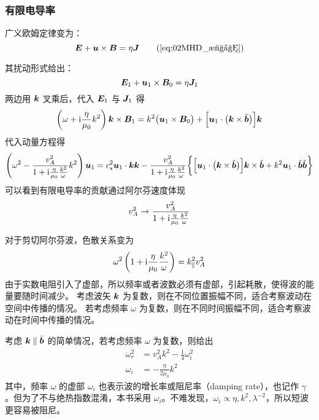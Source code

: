 \subsubsection{有限电导率}

广义欧姆定律变为：
\begin{equation}
\vector{E} + \vector{u} \times \vector{B} = \eta \vector{J} \tag{\ref{eq:02MHD_欧姆}}
\end{equation}

其扰动形式给出：
\begin{equation}
\bm{E}_1 + \bm{u}_1 \times \bm{B}_0 = \eta \bm{J}_1
\end{equation}
两边用 $\bm{k}$ 叉乘后，代入 $\bm{E}_1$ 与 $\bm{J}_1$ 得
\begin{equation}
\left( \omega + \mathrm{i} \frac{\eta}{\mu_0} k^2 \right) \bm{k} \times \bm{B}_1
= k^2 \big( \bm{u}_1 \times \bm{B}_0 \big) + \Big[ \bm{u}_1 \cdot \big(\bm{k} \times \hat{\bm{b}} \big) \Big] \bm{k}
\end{equation}
代入动量方程得
\begin{equation}
\left(\omega^2
    - \frac{v_A^2}{1 + \mathrm{i} \frac{\eta}{\mu_0}\frac{k^2}{\omega}} k^2
\right) \bm{u}_1
= c_s^2 \bm{u}_1 \cdot \bm{k} \bm{k}
- \frac{v_A^2}{1 + \mathrm{i} \frac{\eta}{\mu_0}\frac{k^2}{\omega}} \bigg\{
    \Big[ \bm{u}_1 \cdot \big(\bm{k} \times \hat{\bm{b}} \big) \Big] \bm{k} \times \hat{\bm{b}}
    + k^2 \bm{u}_1 \cdot \hat{\bm{b}} \hat{\bm{b}}
\bigg\}
\end{equation}
可以看到有限电导率的贡献通过阿尔芬速度体现
\begin{equation}
v_A^2 \rightarrow \frac{v_A^2}{1 + \mathrm{i} \frac{\eta}{\mu_0}\frac{k^2}{\omega}}
\end{equation}

对于剪切阿尔芬波，色散关系变为
\begin{equation}
\omega^2 \left(1 + \mathrm{i} \frac{\eta}{\mu_0}\frac{k^2}{\omega}\right) = k_\parallel^2 v_A^2
\end{equation}
由于实数电阻引入了虚部，所以频率或者波数必须有虚部，引起耗散，使得波的能量要随时间减少。
考虑波矢 $\bm{k}$ 为复数，则在不同位置振幅不同，适合考察波动在空间中传播的情况。
若考虑频率 $\omega$ 为复数，则在不同时间振幅不同，适合考察波动在时间中传播的情况。

考虑 $\bm{k} \parallel \hat{\bm{b}}$ 的简单情况，若考虑频率 $\omega$ 为复数，则给出
\begin{subequations}\begin{align}
\omega_r^2 &= v_A^2 k^2 - \frac{1}{4} \omega_i^2 \\
\omega_i &= - \frac{\eta}{2 \mu_0} k^2
\end{align}\end{subequations}
其中，频率 $\omega$ 的虚部 $\omega_i$ 也表示波的增长率或阻尼率（damping rate），也记作 $\gamma$。但为了不与绝热指数混淆，本书采用 $\omega_i$。不难发现，$\omega_i \propto \eta, k^2, \lambda^{-2}$，所以短波更容易被阻尼。

